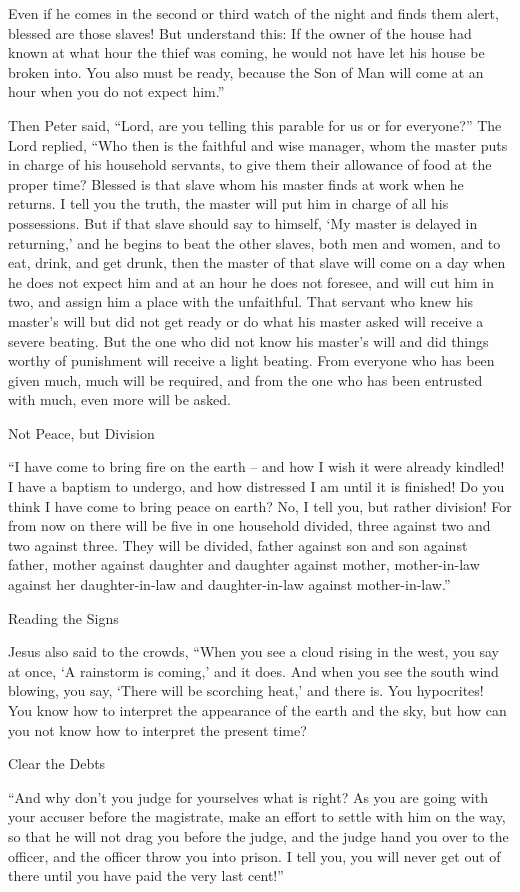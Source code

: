 {Even if he comes in the second or third watch of the night and finds them alert, blessed are those slaves!
But understand this: If the owner of the house had known at what hour the thief was coming, he would not have let his house be broken into.
You also must be ready, because the Son of Man will come at an hour when you do not expect him.”
\par }{\PP {}Then Peter said, “Lord, are you telling this parable for us or for everyone?”
The Lord replied, “Who then is the faithful and wise manager, whom the master puts in charge of his household servants, to give them their allowance of food at the proper time?
Blessed is that slave whom his master finds at work when he returns.
I tell you the truth, the master will put him in charge of all his possessions.
But if that slave should say to himself, ‘My master is delayed in returning,’ and he begins to beat the other slaves, both men and women, and to eat, drink, and get drunk,
then the master of that slave will come on a day when he does not expect him and at an hour he does not foresee, and will cut him in two, and assign him a place with the unfaithful.
That servant who knew his master’s will but did not get ready or do what his master asked will receive a severe beating.
But the one who did not know his master’s will and did things worthy of punishment will receive a light beating. From everyone who has been given much, much will be required, and from the one who has been entrusted with much, even more will be asked.
\par }{\SH Not Peace, but Division
\par }{\PP {}“I have come to bring fire on the earth – and how I wish it were already kindled!
I have a baptism to undergo, and how distressed I am until it is finished!
Do you think I have come to bring peace on earth? No, I tell you, but rather division!
For from now on there will be five in one household divided, three against two and two against three.
They will be divided, father against son and son against father, mother against daughter and daughter against mother, mother-in-law against her daughter-in-law and daughter-in-law against mother-in-law.”
\par }{\SH Reading the Signs
\par }{\PP {}Jesus also said to the crowds, “When you see a cloud rising in the west, you say at once, ‘A rainstorm is coming,’ and it does.
And when you see the south wind blowing, you say, ‘There will be scorching heat,’ and there is.
You hypocrites! You know how to interpret the appearance of the earth and the sky, but how can you not know how to interpret the present time?
\par }{\SH Clear the Debts
\par }{\PP {}“And
 why don’t you judge for yourselves what is right?
As you are going with your accuser before the magistrate, make an effort to settle with him on the way, so that he will not drag you before the judge, and the judge hand you over to the officer, and the officer throw you into prison.
I tell you, you will never get out of there until you have paid the very last cent!”


}
